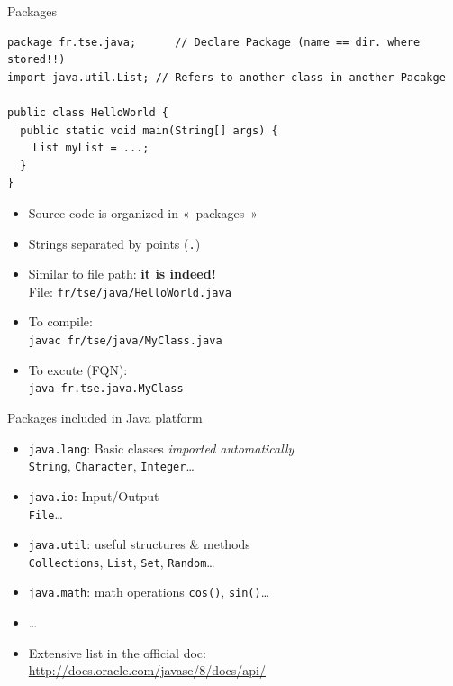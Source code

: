 \documentclass[English,c,%
hyperref={%
    pdftitle={FISA-DE2 OOP in Java},%
    pdfauthor={Muller, Gravier, Laforest, Subercaze},%
    pdfsubject={OOP in Java},%
    pdfkeywords={OOP, Java},%
    colorlinks=true,%
    urlcolor=blue,%
    linkcolor=%
    },%
xcolor={pdftex,svgnames} %
]{beamer}
\begin{document}
\begin{frame}[fragile]{Packages}

\begin{lstlisting}[escapechar=\%,label=hellopackage,caption=HelloWorld.java]
package fr.tse.java;      // Declare Package (name == dir. where stored!!)
import java.util.List; // Refers to another class in another Pacakge

public class HelloWorld {
  public static void main(String[] args) {
    List myList = ...;
  }
}
\end{lstlisting}

{\scriptsize
\begin{itemize}
    \item Source code is organized in «~packages~»
    \item Strings separated by points (\lstinline{.})
    \item Similar to file path: \textbf{it is indeed!} \\
    File: \texttt{fr/tse/java/HelloWorld.java}
    \medskip
    \item To compile: \\
    \texttt{javac fr/tse/java/MyClass.java}
    \item To excute (FQN): \\
    \texttt{java fr.tse.java.MyClass}
\end{itemize}
}

\end{frame}

\begin{frame}[fragile]{Packages included in Java platform}

\begin{itemize}
  \item \texttt{java.lang}: Basic classes \hfill \textit{imported automatically}\\
  \lstinline{String}, \lstinline{Character}, \lstinline{Integer}\ldots{}\\
%
  \medskip
  \item \texttt{java.io}: Input/Output\\
  \lstinline{File}\ldots{}
%
  \medskip
  \item \texttt{java.util}: useful structures \& methods\\
  \lstinline{Collections}, \lstinline{List}, \lstinline{Set}, \lstinline{Random}\ldots{}
%
  \medskip
  \item \texttt{java.math}: math operations
  \lstinline{cos()}, \lstinline{sin()}\ldots{}
%
  \medskip
  \item \ldots{}
%
  \bigskip
  \item Extensive list in the official doc:\\
  \url{http://docs.oracle.com/javase/8/docs/api/}
\end{itemize}

\end{frame}
\end{document}
